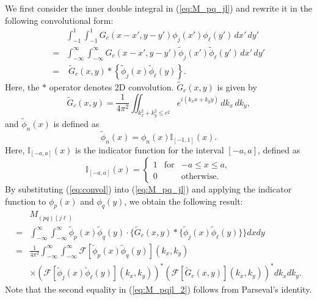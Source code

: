 \documentclass[lettersize,journal]{IEEEtran}
\theoremstyle{plain}
\begin{document}
\section{}
\label{appdix:2D_PSWF_Calculation}
We first consider the inner double integral in (\ref{eq:M_pq_jl}) and rewrite it in the following convolutional form:
\begin{align}
	&\int_{-1}^{1}\int_{-1}^{1}G_c(x-x', y-y')\phi_j(x')\phi_\ell(y')\,dx'\,dy' \nonumber \\
 = & \int_{-\infty}^{\infty}\int_{-\infty}^{\infty}G_c(x-x', y-y')\tilde{\phi}_j(x')\tilde{\phi}_\ell(y')\,dx'\,dy'  \nonumber \\
	= & \; \tilde{G}_c(x, y) \ast \left\{\tilde{\phi}_j(x)\tilde{\phi}_\ell(y)\right\}.
	\label{eq:convol}
\end{align}
Here, the $\ast$ operator denotes 2D convolution. $\tilde{G}_c(x, y)$ is given by
\begin{equation}
	\tilde{G}_c(x, y) = \frac{1}{4\pi^2}\iint_{k_x^2 + k_y^2 \leq c^2}e^{i(k_x x + k_y y)}\,dk_x\,dk_y,
	\label{eq:low_pass_filter_2}
\end{equation}
and $\tilde{\phi}_n(x)$ is defined as
$$
	\tilde{\phi}_n(x) = \phi_n(x)\mathbb{I}_{[-1, 1]}(x).
	\label{eq:phi_tilde}
$$
Here, $\mathbb{I}_{[-a, a]}(x)$ is the indicator function for the interval $[-a, a]$, defined as
$$
	\mathbb{I}_{[-a, a]}(x) = 
	\left\{ \begin{array}{rcl}
		1 & \mbox{for}
		&  -a \leq x \leq a,   \\ 
		0 & & \text{otherwise}.
	\end{array}\right.
	\label{eq:indicator_function}
$$
By substituting (\ref{eq:convol}) into (\ref{eq:M_pq_jl}) and applying the indicator function to $\phi_p(x)$ and $\phi_q(y)$, we obtain the following result:
\begin{align}
	&M_{(pq)(j\ell)}  \nonumber \\ 
	=& \int_{-\infty}^{\infty}\int_{-\infty}^{\infty}\tilde{\phi}_p(x)\tilde{\phi}_q(y)\cdot \big\{\tilde{G}_c(x, y)\ast \big\{\tilde{\phi}_j(x)\tilde{\phi}_\ell(y)\big\}\big\}dxdy  \nonumber \\
	=& \frac{1}{4\pi^2}\int_{-\infty}^{\infty}\int_{-\infty}^{\infty}\mathcal{F}[\tilde{\phi}_p(x)\tilde{\phi}_q(y)](k_x, k_y) \nonumber \\
	&\times(\mathcal{F}[\tilde{\phi}_j(x)\tilde{\phi}_\ell(y)](k_x, k_y))^*
	(\mathcal{F}[\tilde{G}_c(x,y)](k_x, k_y))^*dk_xdk_y.
	\label{eq:M_pqjl_2}
\end{align}
Note that the second equality in (\ref{eq:M_pqjl_2}) follows from Parseval's identity. 
	
\end{document}
